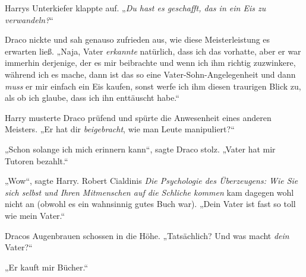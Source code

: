 Harrys Unterkiefer klappte auf. „\emph{Du hast es geschafft, \emph{das} in ein Eis zu verwandeln?}“

Draco nickte und sah genauso zufrieden aus, wie diese Meisterleistung es erwarten ließ. „Naja, Vater \emph{erkannte} natürlich, dass ich das vorhatte, aber er war immerhin derjenige, der es mir beibrachte und wenn ich ihm richtig zuzwinkere, während ich es mache, dann ist das so eine Vater-Sohn-Angelegenheit und dann \emph{muss} er mir einfach ein Eis kaufen, sonst werfe ich ihm diesen traurigen Blick zu, als ob ich glaube, dass ich ihn enttäuscht habe.“

Harry musterte Draco prüfend und spürte die Anwesenheit eines anderen Meisters. „Er hat dir \emph{beigebracht}, wie man Leute manipuliert?“

„Schon solange ich mich erinnern kann“, sagte Draco stolz. „Vater hat mir Tutoren bezahlt.“

„Wow“, sagte Harry. Robert Cialdinis \emph{Die Psychologie des Überzeugens: Wie Sie sich selbst und Ihren Mitmenschen auf die Schliche kommen} kam dagegen wohl nicht an (obwohl es ein wahnsinnig gutes Buch war). „Dein Vater ist fast so toll wie mein Vater.“%

Dracos Augenbrauen schossen in die Höhe. „Tatsächlich? Und was macht \emph{dein} Vater?“

„Er kauft mir Bücher.“

